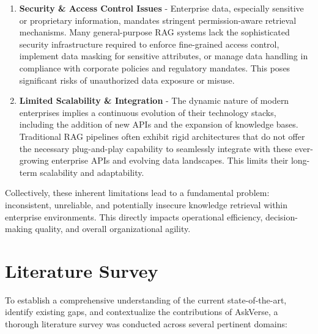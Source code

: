 \documentclass[default]{sn-jnl}%
\begin{document}
\begin{enumerate}
    \item \textbf{Security \& Access Control Issues} - Enterprise data, especially sensitive or proprietary information, mandates stringent permission-aware retrieval mechanisms. Many general-purpose RAG systems lack the sophisticated security infrastructure required to enforce fine-grained access control, implement data masking for sensitive attributes, or manage data handling in compliance with corporate policies and regulatory mandates. This poses significant risks of unauthorized data exposure or misuse.
    \item \textbf{Limited Scalability \& Integration} - The dynamic nature of modern enterprises implies a continuous evolution of their technology stacks, including the addition of new APIs and the expansion of knowledge bases. Traditional RAG pipelines often exhibit rigid architectures that do not offer the necessary plug-and-play capability to seamlessly integrate with these ever-growing enterprise APIs and evolving data landscapes. This limits their long-term scalability and adaptability.
\end{enumerate}

Collectively, these inherent limitations lead to a fundamental problem: inconsistent, unreliable, and potentially insecure knowledge retrieval within enterprise environments. This directly impacts operational efficiency, decision-making quality, and overall organizational agility.

\section*{Literature Survey}
To establish a comprehensive understanding of the current state-of-the-art, identify existing gaps, and contextualize the contributions of AskVerse, a thorough literature survey was conducted across several pertinent domains:
\end{document}
